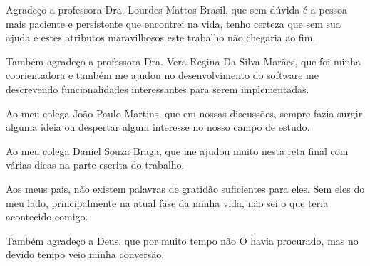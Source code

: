 \begin{agradecimentos}
	Agradeço a professora Dra. Lourdes Mattos Brasil, que sem dúvida é a pessoa mais paciente e persistente que encontrei na vida, tenho certeza que sem sua ajuda e estes atributos maravilhosos este trabalho não chegaria ao fim.

	Também agradeço a professora Dra. Vera Regina Da Silva Marães, que foi minha coorientadora e também me ajudou no desenvolvimento do software me descrevendo funcionalidades interessantes para serem implementadas.
	
	Ao meu colega João Paulo Martins, que em nossas discussões, sempre fazia surgir alguma ideia ou despertar algum interesse no nosso campo de estudo.
	
	Ao meu colega Daniel Souza Braga, que me ajudou muito nesta reta final com várias dicas na parte escrita do trabalho.

	Aos meus pais, não existem palavras de gratidão suficientes para eles. Sem eles do meu lado, principalmente na atual fase da minha vida, não sei o que teria acontecido comigo.

	Também
	agradeço a Deus, que por muito tempo não O havia procurado, mas no devido tempo veio minha conversão.
	
\end{agradecimentos}
